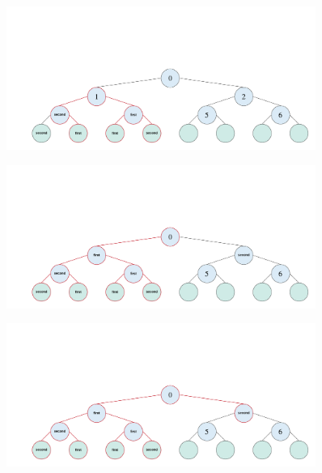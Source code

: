 
\begin{figure}[H]
\centering
\includegraphics[width=0.9\textwidth]{pics/kd-tree-visual/7.png}
\caption{}
\end{figure}



\begin{figure}[H]
\centering
\includegraphics[width=0.9\textwidth]{pics/kd-tree-visual/10.png}
\caption{}
\end{figure}

\begin{figure}[H]
\centering
\includegraphics[width=0.9\textwidth]{pics/kd-tree-visual/11.png}
\caption{}
\end{figure}




